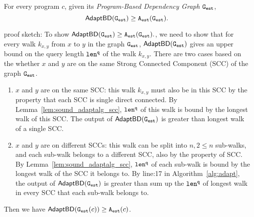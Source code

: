 \begin{thm}
  \label{thm:sound_adaptalg}
  For every program $c$, given its \emph{Program-Based Dependency Graph} $\mathtt{{G_{est}}}$,
   $$\mathsf{AdaptBD}(\mathtt{{G_{est}}}) \geq {\ensuremath{\mathtt{A_{est}}}}(\mathtt{{G_{est}}}).$$
\end{thm}
proof sketch:
To show $\mathsf{AdaptBD}(\mathtt{{G_{est}}}) \geq {\ensuremath{\mathtt{A_{est}}}}(\mathtt{{G_{est}}}).$, we need to show that 
for every walk $k_{x,y}$ from $x$ to $y$ in the graph $\mathtt{{G_{est}}}$,
$\mathsf{AdaptBD}(\mathtt{{G_{est}}})$ gives an upper bound on the query length $\mathtt{len}^{\tt q}$ of the walk $k_{x,y}$.
There are two cases based on the whether $x$ and $y$ are on the same Strong Connected Component (SCC) of the graph $\mathtt{{G_{est}}}$.
\begin{enumerate}
  \item $x$ and $y$ are on the same SCC: this walk $k_{x,y}$  must also be in this SCC by the property that each
   SCC is single direct connected. By Lemma~\ref{lem:sound_adaptalg_scc}, $\mathtt{len}^{\tt q}$ of this walk is bound by the longest walk of this SCC.
   The output of $\mathsf{AdaptBD}(\mathtt{{G_{est}}})$ is greater than longest walk of a single SCC.
  \item $x$ and $y$ are on different SCCs: this walk can be split into $n, 2 \leq n$ sub-walks, and each sub-walk belongs to a different SCC, 
  also by the property of SCC.  By Lemma~\ref{lem:sound_adaptalg_scc}, $\mathtt{len}^{\tt q}$ of each sub-walk is bound by the longest walk of the SCC it belongs 
  to. By line:17 in Algorithm~\ref{alg:adapt}, the output of $\mathsf{AdaptBD}(\mathtt{{G_{est}}})$ is greater than sum up the $\mathtt{len}^{\tt q}$ of longest walk in every SCC that each sub-walk belongs to.
\end{enumerate}
Then we have
$\mathsf{AdaptBD}(\mathtt{{G_{est}}}(c)) \geq {\ensuremath{\mathtt{A_{est}}}}(c)$.
